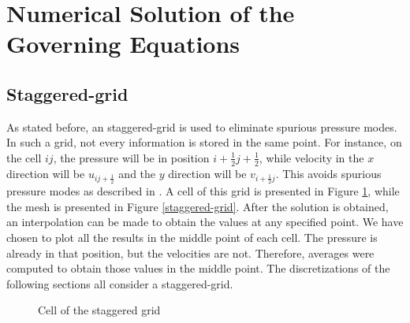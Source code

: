 \documentclass[journal]{IEEEtran}
\begin{document}
\section{Numerical Solution of the Governing Equations}

\subsection{Staggered-grid}

As stated before, an staggered-grid is used to eliminate spurious pressure modes. In such a grid, not every information is stored in the same point. For instance, on the cell $ij$, the pressure will be in position $i+\frac{1}{2}j+\frac{1}{2}$, while velocity in the $x$ direction will be $u_{ij+\frac{1}{2}}$ and the $y$ direction will be $v_{i+\frac{1}{2}j}$. This avoids spurious pressure modes as described in \cite{hinchLectureNotes}. A cell of this grid is presented in Figure \ref{grid-cell}, while the mesh is presented in Figure \ref{staggered-grid}. After the solution is obtained, an interpolation can be made to obtain the values at any specified point. We have chosen to plot all the results in the middle point of each cell. The pressure is already in that position, but the velocities are not. Therefore, averages were computed to obtain those values in the middle point. The discretizations of the following sections all consider a staggered-grid.

\begin{figure}[!ht]
\centering
{}
\caption{Cell of the staggered grid\label{grid-cell}}
\end{figure}
\end{document}
